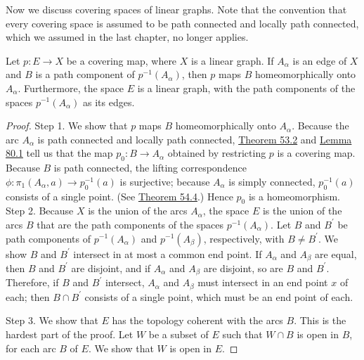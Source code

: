 Now we discuss covering spaces of linear graphs. Note that the convention that every covering space is assumed to be path connected and locally path connected, which we assumed in the last chapter, no longer applies.
\begin{theorem}
\label{thm:\thetheorem}
	Let \(p : E \rightarrow X\) be a covering map, where \(X\) is a linear graph. If \(A_{\alpha }\) is an edge of \(X\) and \(B\) is a path component of \(p^{-1}( A_{\alpha })\), then \(p\) maps \(B\) homeomorphically onto \(A_{\alpha }\). Furthermore, the space \(E\) is a linear graph, with the path components of the spaces \(p^{-1}( A_{\alpha })\) as its edges.
\end{theorem}

\begin{proof}
	Step 1. We show that \(p\) maps \(B\) homeomorphically onto \(A_{\alpha }\). Because the arc \(A_{\alpha }\) is path connected and locally path connected, \hyperref[thm:53.2]{Theorem 53.2} and \hyperref[lem:80.1]{Lemma 80.1} tell us that the map \(p_{0} : B \rightarrow {A}_{\alpha }\) obtained by restricting \(p\) is a covering map. Because \(B\) is path connected, the lifting correspondence \(\phi : {\pi }_{1}( {A_{\alpha },a}) \rightarrow {p}_0^{-1}( a)\) is surjective; because \(A_{\alpha }\) is simply connected, \(p_0^{-1}( a)\) consists of a single point. (See \hyperref[thm:54.4]{Theorem 54.4}.) Hence \(p_{0}\) is a homeomorphism.
Step 2. Because \(X\) is the union of the arcs \(A_{\alpha }\), the space \(E\) is the union of the arcs \(B\) that are the path components of the spaces \(p^{-1}( A_{\alpha })\). Let \(B\) and \(B^{\prime }\) be path components of \(p^{-1}( A_{\alpha })\) and \(p^{-1}( A_{\beta })\), respectively, with \(B \neq {B}^{\prime }\). We show \(B\) and \(B^{\prime }\) intersect in at most a common end point. If \(A_{\alpha }\) and \(A_{\beta }\) are equal, then \(B\) and \(B^{\prime }\) are disjoint, and if \(A_{\alpha }\) and \(A_{\beta }\) are disjoint, so are \(B\) and \(B^{\prime }\). Therefore, if \(B\) and \(B^{\prime }\) intersect, \(A_{\alpha }\) and \(A_{\beta }\) must intersect in an end point \(x\) of each; then \(B \cap {B}^{\prime }\) consists of a single point, which must be an end point of each.

Step 3. We show that \(E\) has the topology coherent with the arcs \(B\). This is the hardest part of the proof. Let \(W\) be a subset of \(E\) such that \(W \cap B\) is open in \(B\), for each arc \(B\) of \(E\). We show that \(W\) is open in \(E\).


\end{proof}
